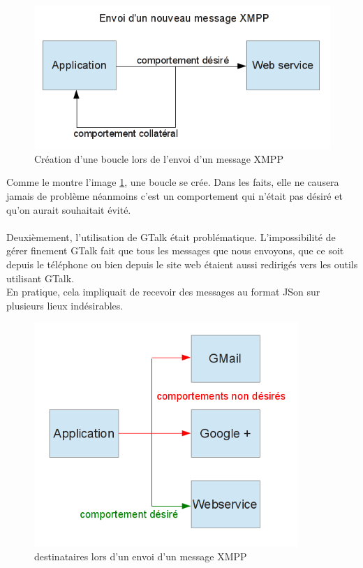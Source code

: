 \begin{figure}[!h]
	\center
	\includegraphics[width=12cm]{img/boucle-envoi-xmpp.png}
	\caption{Création d'une boucle lors de l'envoi d'un message XMPP}
	\label{boucle-envoi-xmpp}
\end{figure}

Comme le montre l'image \ref{boucle-envoi-xmpp}, une boucle se crée. Dans les faits, elle ne causera jamais de problème 
néanmoins c'est un comportement qui n'était pas désiré et qu'on aurait souhaitait évité.
\\\\
Deuxièmement, l'utilisation de GTalk était problématique. L'impossibilité de gérer finement GTalk fait que
tous les messages que nous envoyons, que ce soit depuis le téléphone ou bien depuis le site web étaient
aussi redirigés vers les outils utilisant GTalk.
\\
En pratique, cela impliquait de recevoir des messages au format JSon sur plusieurs lieux indésirables.

\begin{figure}[!h]
	\center
	\includegraphics[width=10cm]{img/broadcast-xmpp.png}
	\caption{destinataires lors d'un envoi d'un message XMPP}
	\label{broadcast-xmpp}
\end{figure}

